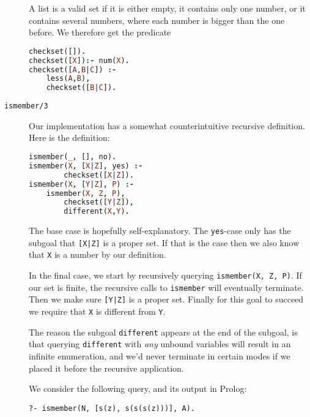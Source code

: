 \documentclass[a4paper]{article}
\newcommand{\pfunc}[1]{\textnormal{\texttt{#1}}\xspace}
\newcommand{\pfuncn}[2]{\textnormal{\texttt{#1/#2}}\xspace}
\newcommand{\plVar}[1]{\texttt{#1}\xspace}
\begin{document}
\begin{description}
A list is a valid set if it is either empty, it contains only one number, or it contains several numbers, where each number is bigger than the one before.  We therefore get the predicate 
\begin{lstlisting}[language=prolog]
checkset([]).
checkset([X]):- num(X).
checkset([A,B|C]) :- 
	less(A,B), 
	checkset([B|C]).
\end{lstlisting}
\item[\pfuncn{ismember}{3}] Our implementation has a somewhat counterintuitive recursive definition. Here is the definition:
  \begin{lstlisting}[language=prolog]
ismember(_, [], no).
ismember(X, [X|Z], yes) :-
        checkset([X|Z]).
ismember(X, [Y|Z], P) :-
	ismember(X, Z, P),
        checkset([Y|Z]),
        different(X,Y).
\end{lstlisting}
The base case is hopefully self-explanatory. The \texttt{yes}-case only has the subgoal that \texttt{[X|Z]} is a proper set. If that is the case then we also know that \plVar{X} is a number by our definition.

In the final case, we start by recursively querying \texttt{ismember(X, Z, P)}. If our set is finite, the recursive calls to \pfunc{ismember} will eventually terminate. Then we make sure \plVar{[Y|Z]} is a proper set. Finally for this goal to succeed we require that \plVar{X} is different from \plVar{Y}.

The reason the subgoal \pfunc{different} appears at the end of the subgoal, is that querying \pfunc{different} with \emph{any} unbound variables will result in an infinite enumeration, and we'd never terminate in certain modes if we placed it before the recursive application.

We consider the following query, and its output in Prolog:
\begin{center}
\texttt{?- ismember(N, [s(z), s(s(s(z)))], A).}
\end{center}


\end{description}
\end{document}
